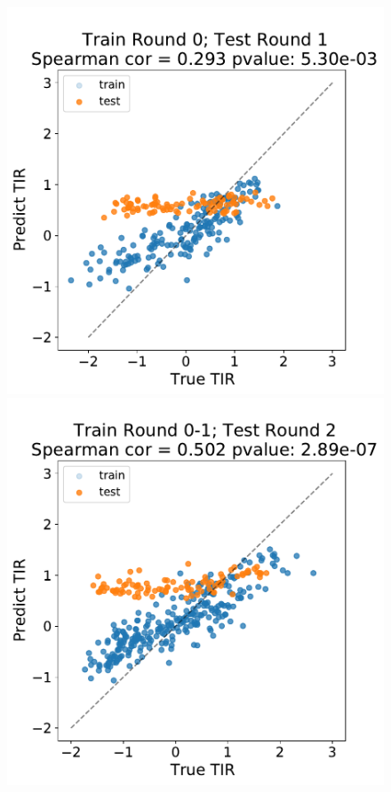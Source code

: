 \documentclass{scrartcl}[2013/05/29]%
\begin{document}
\begin{figure}[!ht]
    \centering
    \includegraphics[scale = 0.35]{plots/Supplementary/scatter_bc1_TTF_0.pdf}
    \includegraphics[scale = 0.35]{plots/Supplementary/scatter_abc1_TT_1.pdf}

\end{figure}
\end{document}
